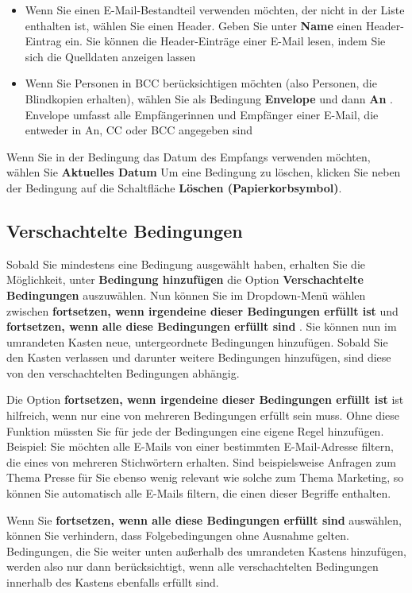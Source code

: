 \documentclass[
  letterpaper,
  DIV=11,
  numbers=noendperiod]{scrreprt}
\providecommand{\tightlist}{%
  \setlength{\itemsep}{0pt}\setlength{\parskip}{0pt}}\usepackage{longtable,booktabs,array}
\begin{document}
\begin{itemize}
\tightlist
\item
  Wenn Sie einen E-Mail-Bestandteil verwenden möchten, der nicht in der
  Liste enthalten ist, wählen Sie einen Header. Geben Sie unter
  \textbf{Name} einen Header-Eintrag ein. Sie können die Header-Einträge
  einer E-Mail lesen, indem Sie sich die Quelldaten anzeigen lassen
\item
  Wenn Sie Personen in BCC berücksichtigen möchten (also Personen, die
  Blindkopien erhalten), wählen Sie als Bedingung \textbf{Envelope} und
  dann \textbf{An} . Envelope umfasst alle Empfängerinnen und Empfänger
  einer E-Mail, die entweder in An, CC oder BCC angegeben sind
\end{itemize}

Wenn Sie in der Bedingung das Datum des Empfangs verwenden möchten,
wählen Sie \textbf{Aktuelles Datum} Um eine Bedingung zu löschen,
klicken Sie neben der Bedingung auf die Schaltfläche \textbf{Löschen
(Papierkorbsymbol)}.

\subsection{Verschachtelte
Bedingungen}\label{verschachtelte-bedingungen}

Sobald Sie mindestens eine Bedingung ausgewählt haben, erhalten Sie die
Möglichkeit, unter \textbf{Bedingung hinzufügen} die Option
\textbf{Verschachtelte Bedingungen} auszuwählen. Nun können Sie im
Dropdown-Menü wählen zwischen \textbf{fortsetzen, wenn irgendeine dieser
Bedingungen erfüllt ist} und \textbf{fortsetzen, wenn alle diese
Bedingungen erfüllt sind} . Sie können nun im umrandeten Kasten neue,
untergeordnete Bedingungen hinzufügen. Sobald Sie den Kasten verlassen
und darunter weitere Bedingungen hinzufügen, sind diese von den
verschachtelten Bedingungen abhängig.

Die Option \textbf{fortsetzen, wenn irgendeine dieser Bedingungen
erfüllt ist} ist hilfreich, wenn nur eine von mehreren Bedingungen
erfüllt sein muss. Ohne diese Funktion müssten Sie für jede der
Bedingungen eine eigene Regel hinzufügen. Beispiel: Sie möchten alle
E-Mails von einer bestimmten E-Mail-Adresse filtern, die eines von
mehreren Stichwörtern erhalten. Sind beispielsweise Anfragen zum Thema
Presse für Sie ebenso wenig relevant wie solche zum Thema Marketing, so
können Sie automatisch alle E-Mails filtern, die einen dieser Begriffe
enthalten.

Wenn Sie \textbf{fortsetzen, wenn alle diese Bedingungen erfüllt sind}
auswählen, können Sie verhindern, dass Folgebedingungen ohne Ausnahme
gelten. Bedingungen, die Sie weiter unten außerhalb des umrandeten
Kastens hinzufügen, werden also nur dann berücksichtigt, wenn alle
verschachtelten Bedingungen innerhalb des Kastens ebenfalls erfüllt
sind.
\end{document}
